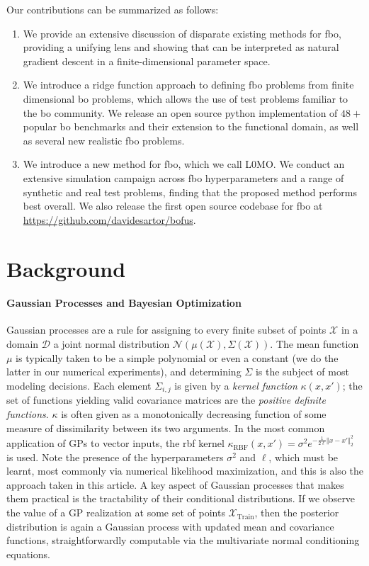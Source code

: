 \documentclass{article}
\newcommand{\wycoff}{\textsc{L0MO}}
\newcommand{\D}{\mathcal{D}} %
\newcommand{\kernelGP}{\kappa}
\begin{document}
Our contributions can be summarized as follows:
\begin{enumerate}
    \item We provide an extensive discussion of disparate existing methods for \gls{fbo}, providing a unifying lens and showing that \cite{vien2018bayesian} can be interpreted as natural gradient descent in a finite-dimensional parameter space.
    \item We introduce a ridge function \cite{pinkus2015ridge} approach to defining \gls{fbo} problems from finite dimensional \gls{bo} problems, which allows the use of test problems familiar to the \gls{bo} community.
    We release an open source python implementation of $48+$ popular \gls{bo} benchmarks and their extension to the functional domain,
    as well as several new realistic \gls{fbo} problems.
    \item We introduce a new method for \gls{fbo}, which we call \wycoff{}. We conduct an extensive simulation campaign across \gls{fbo} hyperparameters and a range of synthetic and real test problems, finding that the proposed method performs best overall.
    We also release the first open source codebase for \gls{fbo} at \url{https://github.com/davidesartor/bofus}.
\end{enumerate}

\section{Background}

\paragraph{Gaussian Processes and Bayesian Optimization}

Gaussian processes \citep{rnw} are a rule for assigning to every finite subset of points $\mathcal{X}$ in a domain $\D$ a joint normal distribution $\mathcal{N}(\mu(\mathcal{X}), \Sigma(\mathcal{X}))$.
The mean function $\mu$ is typically taken to be a simple polynomial or even a constant (we do the latter in our numerical experiments), and determining $\Sigma$ is the subject of most modeling decisions.
Each element $\Sigma_{i,j}$ is given by a \emph{kernel function} $\kernelGP(x,x')$; the set of functions yielding valid covariance matrices are the \emph{positive definite functions}.
$\kernelGP$ is often given as a monotonically decreasing function of some measure of dissimilarity between its two arguments.
In the most common application of GPs to vector inputs, the \gls{rbf} kernel $\kernelGP_{\textrm{RBF}}(x,x') = \sigma^2 e^{-\frac{1}{2\ell}\Vert x-x'\Vert_2^2}$ is used.
Note the presence of the hyperparameters $\sigma^2$ and $\ell$, which must be learnt, most commonly via numerical likelihood maximization, and this is also the approach taken in this article.
A key aspect of Gaussian processes that makes them practical is the tractability of their conditional distributions.
If we observe the value of a GP realization at some set of points $\mathcal{X}_{\textrm{Train}}$, then the posterior distribution is again a Gaussian process with updated mean and covariance functions, straightforwardly computable via the multivariate normal conditioning equations.
\end{document}
